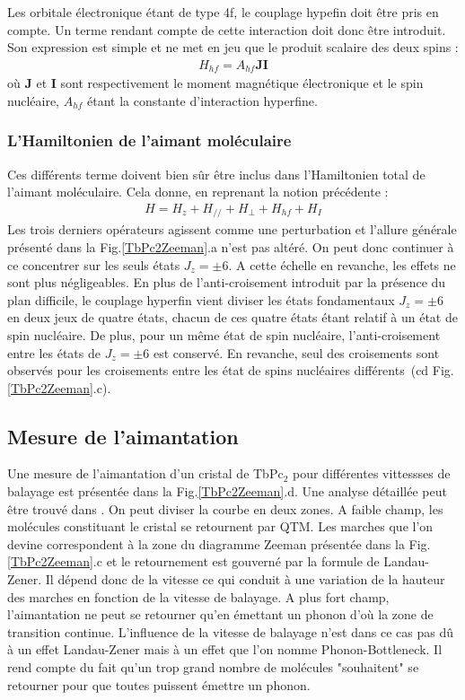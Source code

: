 Les orbitale électronique étant de type 4f, le couplage hypefin doit \^etre pris en compte. Un terme rendant compte de cette interaction doit donc \^etre introduit. Son expression est simple et ne met en jeu que le produit scalaire des deux spins :
\begin{eqnarray}
H_{hf} = A_{hf}\mathbf{J}\mathbf{I}
\end{eqnarray}
où $\mathbf{J}$ et $\mathbf{I}$ sont respectivement le moment magnétique électronique et le spin nucléaire, $A_{hf}$ étant la constante d'interaction hyperfine.

\subsubsection{L'Hamiltonien de l'aimant moléculaire}

Ces différents terme doivent bien s\^ur \^etre inclus dans l'Hamiltonien total de l'aimant moléculaire. Cela donne, en reprenant la notion précédente :
\begin{eqnarray}
H = H_z + H_{//} + H_{\perp} + H_{hf} + H_I
\end{eqnarray}
Les trois derniers opérateurs agissent comme une perturbation et l'allure générale présenté dans la Fig.\ref{TbPc2Zeeman}.a n'est pas altéré. On peut donc continuer à ce concentrer sur les seuls états $J_z = \pm 6$. A cette échelle en revanche, les effets ne sont plus négligeables. En plus de l'anti-croisement introduit par la présence du plan difficile, le couplage hyperfin vient diviser les états fondamentaux  $J_z = \pm 6$ en deux jeux de quatre états, chacun de ces quatre états étant relatif à un état de spin nucléaire. De plus, pour un m\^eme état de spin nucléaire, l'anti-croisement entre les états de  $J_z = \pm 6$ est conservé. En revanche, seul des croisements sont observés pour les croisements entre les état de spins nucléaires différents~(cd Fig. \ref{TbPc2Zeeman}.c).

\subsection{Mesure de l'aimantation}
Une mesure de l'aimantation d'un cristal de TbPc$_2$ pour différentes vittessses de balayage est présentée dans la Fig.\ref{TbPc2Zeeman}.d. Une analyse détaillée peut \^etre trouvé dans \cite{Ishikawa2005}. On peut diviser la courbe en deux zones. A faible champ, les molécules constituant le cristal se retournent par QTM. Les marches que l'on devine correspondent à la zone du diagramme Zeeman présentée dans la Fig.\ref{TbPc2Zeeman}.c et le retournement est gouverné par la formule de Landau-Zener. Il dépend donc de la vitesse ce qui conduit à une variation de la hauteur des marches en fonction de la vitesse de balayage. A plus fort champ, l'aimantation ne peut se retourner qu'en émettant un phonon d'où la zone de transition continue. L'influence de la vitesse de balayage n'est dans ce cas pas d\^u à un effet Landau-Zener mais à un effet que l'on nomme Phonon-Bottleneck. Il rend compte du fait qu'un trop grand nombre de molécules "souhaitent" se retourner pour que toutes puissent émettre un phonon.